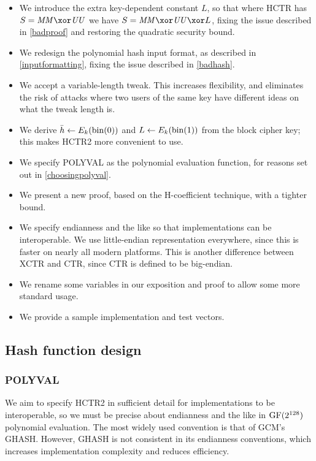 \documentclass[hctr2.tex]{subfiles}
\begin{document}
\begin{itemize}
    \item We introduce the extra
    key-dependent constant \(L\),
    so that where HCTR has \(S = \MM \xor \UU\)
    we have \(S = \MM \xor \UU \xor L\),
    fixing the issue described in \autoref{badproof}
    and restoring the quadratic security bound.
    \item We redesign the polynomial hash input format, as described in
    \autoref{inputformatting}, fixing the issue described in \autoref{badhash}.
    \item We accept a variable-length tweak.
    This increases flexibility,
    and eliminates the risk of attacks where
    two users of the same key have different ideas
    on what the tweak length is.
    \item We derive \(\bar{h} \gets E_k(\operatorname{bin}(0))\)
    and \(L \gets E_k(\operatorname{bin}(1))\) from the block cipher key;
    this makes HCTR2 more convenient to use.
    \item We specify POLYVAL\cite{aes_gcm_siv,aes_gcm_siv_rfc}
    as the polynomial evaluation function,
    for reasons set out in \autoref{choosingpolyval}.
    \item We present a new proof, based on the H-coefficient technique,
    with a tighter bound.
    \item We specify endianness and the like so that implementations can be interoperable. We use little-endian representation everywhere,
    since this is faster on nearly all modern platforms.
    This is another difference between XCTR and CTR, since
    CTR is defined to be big-endian.
    \item We rename some variables in our exposition and proof to allow some more standard usage.
    \item We provide a sample implementation and test vectors.
\end{itemize}

\subsection{Hash function design}\label{hashdesign}

\subsubsection{POLYVAL}\label{choosingpolyval}

We aim to specify HCTR2 in sufficient detail
for implementations to be interoperable,
so we must be precise about endianness and the like
in \(\operatorname{GF}(2^{128})\) polynomial evaluation.
The most widely used  convention is that of GCM's GHASH\cite{gcm}.
However, GHASH is not consistent in its endianness conventions,
which increases implementation complexity and reduces efficiency.
\end{document}
